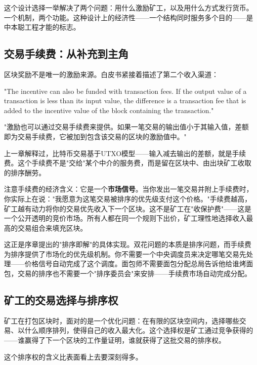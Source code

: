 \documentclass[a4paper,12pt,openany]{ctexbook}
\newenvironment{quoting}{%
  \par\vspace{0.5em}%
  \begin{list}{}{%
    \setlength{\leftmargin}{2em}%
    \setlength{\rightmargin}{2em}%
    \setlength{\parsep}{0.3em}%
    \setlength{\itemsep}{0pt}%
    \setlength{\topsep}{0pt}%
  }%
  \item\relax
}{%
  \end{list}%
  \par\vspace{0.5em}%
}
\begin{document}
这个设计选择一举解决了两个问题：用什么激励矿工，以及用什么方式发行货币。一个机制，两个功能。这种设计上的经济性——一个结构同时服务多个目的——是中本聪工程才能的标志。


\subsection*{交易手续费：从补充到主角}


区块奖励不是唯一的激励来源。白皮书紧接着描述了第二个收入渠道：


\begin{quoting}
\small
"The incentive can also be funded with transaction fees. If the output value of a transaction is less than its input value, the difference is a transaction fee that is added to the incentive value of the block containing the transaction."

"激励也可以通过交易手续费来提供。如果一笔交易的输出值小于其输入值，差额即为交易手续费，它被加到包含该交易的区块的激励值中。"
\end{quoting}


上一章解释过，比特币交易基于UTXO模型——输入减去输出的差额，就是手续费。这个手续费不是"交给"某个中介的服务费，而是留在区块中、由出块矿工收取的排序酬劳。

注意手续费的经济含义：它是一个\textbf{市场信号}。当你发出一笔交易并附上手续费时，你实际上在说："我愿意为这笔交易被排序的优先级支付这个价格。"手续费越高，矿工越有动力将你的交易优先收入下一个区块。这不是矿工在"收保护费"——这是一个公开透明的竞价市场。所有人都在同一个规则下出价，矿工理性地选择收入最高的交易组合来填充区块。

这正是序章提出的"排序即解"的具体实现。双花问题的本质是排序问题，而手续费为排序提供了市场化的优先级机制。你不需要一个中央调度员来决定哪笔交易先处理——价格信号自动完成了这个调度。面包师不需要面包分配总局告诉他给谁烤面包，交易的排序也不需要一个"排序委员会"来安排——手续费市场自动完成分配。


\subsection*{矿工的交易选择与排序权}


矿工在打包区块时，面对的是一个优化问题：在有限的区块空间内，选择哪些交易、以什么顺序排列，使得自己的收入最大化。这个选择权是矿工通过竞争获得的——谁赢得了下一个区块的工作量证明，谁就获得了这批交易的排序权。

这个排序权的含义比表面看上去要深刻得多。
\end{document}
